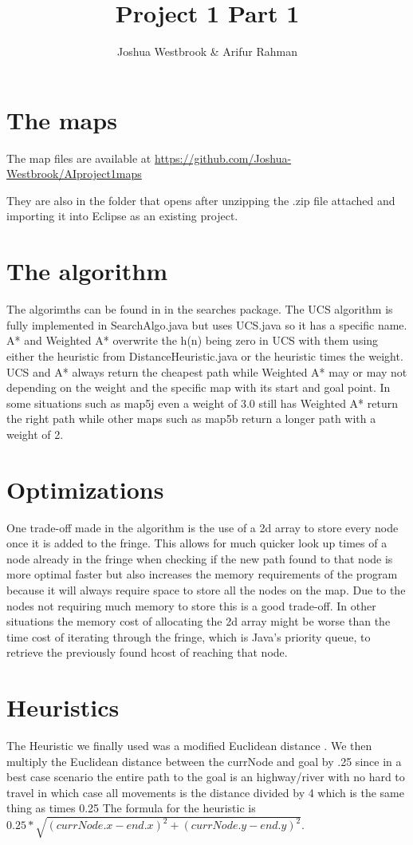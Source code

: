 \documentclass[11pt]{article} %
\title{Project 1 Part 1}
\author{Joshua Westbrook \& Arifur Rahman}
\date{} %
\begin{document}
\maketitle

\section{The maps}

The map files are available at \url{https://github.com/Joshua-Westbrook/AIproject1maps}

They are also in the folder that opens after unzipping the .zip file attached and importing it into Eclipse as an existing project.

\section{The algorithm}

The algorimths can be found in in the searches package. The UCS algorithm is fully implemented in SearchAlgo.java but uses UCS.java so it has a specific name. A* and Weighted A* overwrite the h(n) being zero in UCS with them using either the heuristic from DistanceHeuristic.java or the heuristic times the weight. UCS and A* always return the cheapest path while Weighted A* may or may not depending on the weight and the specific map with its start and goal point. In some situations such as map5j even a weight of 3.0 still has Weighted A* return the right path while other maps such as map5b return a longer path with a weight of 2.


\section{Optimizations}
One trade-off made in the algorithm is the use of a 2d array to store every node once it is added to the fringe. This allows for much quicker look up times of a node already in the fringe when checking if the new path found to that node is more optimal faster but also increases the memory requirements of the program because it will always require space to store all the nodes on the map. Due to the nodes not requiring much memory to store this is a good trade-off. In other situations the memory cost of allocating the 2d array might be worse than the time cost of iterating through the fringe, which is Java's priority queue, to retrieve the previously found hcost of reaching that node. 	

\section{Heuristics}
The Heuristic we finally used was a modified Euclidean distance . We then multiply the Euclidean distance between the currNode and goal by .25 since in a best case scenario the entire path to the goal is an highway/river with no hard to travel in which case all movements is the distance divided by 4 which is the same thing as times 0.25
The formula for the heuristic is $0.25 * \sqrt{(currNode.x - end.x)^2 + (currNode.y - end.y)^2}$.
\end{document}
